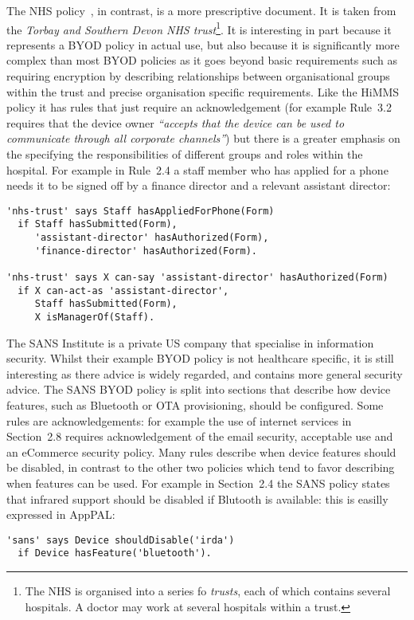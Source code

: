 \documentclass[a4paper]{article}
\begin{document}
The NHS policy~\cite{kennington_mobiles_2014}, in contrast, is a more prescriptive document.
It is taken from the \emph{Torbay and Southern Devon NHS trust}\footnote{The NHS is organised into a series fo \emph{trusts}, each of which contains several hospitals.  A doctor may work at several hospitals within a trust.}. 
It is interesting in part because it represents a \ac{BYOD} policy in actual use, but also because it is significantly more complex than most \ac{BYOD} policies as it goes beyond basic requirements such as requiring encryption by describing relationships between organisational groups within the trust and precise organisation specific requirements.
Like the \ac{HiMMS} policy it has rules that just require an acknowledgement (for example Rule~3.2 requires that the device owner \emph{``accepts that the device can be used to communicate through all corporate channels''}) but there is a greater emphasis on the specifying the responsibilities of different groups and roles within the hospital.  For example in Rule~2.4 a staff member who has applied for a phone needs it to be signed off by a finance director and a relevant assistant director:
\begin{lstlisting}[title={\footnotesize\textbf{\ac{NHS}}:~\itshape 
Upon receipt of the completed application form, allocation will also need to be authorised by the relevant Assistant Director and the Director of Finance.}]
'nhs-trust' says Staff hasAppliedForPhone(Form)
  if Staff hasSubmitted(Form),
     'assistant-director' hasAuthorized(Form),
     'finance-director' hasAuthorized(Form).

'nhs-trust' says X can-say 'assistant-director' hasAuthorized(Form)
  if X can-act-as 'assistant-director',
     Staff hasSubmitted(Form),
     X isManagerOf(Staff).
\end{lstlisting}

The SANS Institute is a private US company that specialise in information security.
Whilst their example \ac{BYOD} policy is not healthcare specific, it is still interesting as there advice is widely regarded, and contains more general security advice.
The SANS \ac{BYOD} policy is split into sections that describe how device features, such as Bluetooth or OTA provisioning, should be configured.  Some rules are acknowledgements: for example the use of internet services in Section~2.8 requires acknowledgement of the email security, acceptable use and an eCommerce security policy.
Many rules describe when device features should be disabled, in contrast to the other two policies which tend to favor describing when features can be used.
For example in Section~2.4 the SANS policy states that infrared support should be disabled if Blutooth is available: this is easilly expressed in AppPAL:
\begin{lstlisting}[title={\footnotesize\textbf{\ac{SANS}}:~\itshape 
Infrared supported MUST be disabled if Bluetooth connectivity is supported.}]
'sans' says Device shouldDisable('irda')
  if Device hasFeature('bluetooth').
\end{lstlisting}
\end{document}
